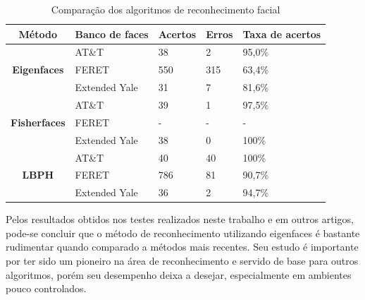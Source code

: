 \begin{table}[htbp]
\centering
\caption{Comparação dos algoritmos de reconhecimento facial}
\label{tab:compara_reconhecimento}
\begin{tabular}{|c|l|l|l|l|}
\hline
\textbf{Método}                       & \textbf{Banco de faces} & \textbf{Acertos} & \textbf{Erros} & \textbf{Taxa de acertos} \\\hline
\multirow{3}{*}{\textbf{Eigenfaces}}  & AT\&T                   & 38               & 2              & 95,0\%                   \\
                                      & FERET                   & 550              & 315            & 63,4\%                   \\
                                      & Extended Yale           & 31               & 7              & 81,6\%                   \\\hline
\multirow{3}{*}{\textbf{Fisherfaces}} & AT\&T                   & 39               & 1              & 97,5\%                   \\
                                      & FERET\footnotemark[\value{footnote}] & -   & -              & -                        \\
                                      & Extended Yale           & 38               & 0              & 100\%                    \\\hline
\multirow{3}{*}{\textbf{LBPH}}        & AT\&T                   & 40               & 40             & 100\%                    \\
                                      & FERET                   & 786              & 81             & 90,7\%                   \\
                                      & Extended Yale           & 36               & 2              & 94,7\%                   \\\hline
\end{tabular}
\end{table}


Pelos resultados obtidos nos testes realizados neste trabalho e em outros artigos, pode-se concluir que o método de reconhecimento utilizando eigenfaces é bastante rudimentar quando comparado a métodos mais recentes. Seu estudo é importante por ter sido um pioneiro na área de reconhecimento e servido de base para outros algoritmos, porém seu desempenho deixa a desejar, especialmente em ambientes pouco controlados.